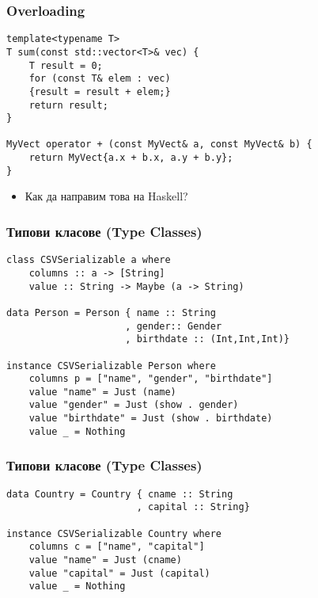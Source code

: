 \documentclass{beamer}
\begin{document}
\begin{frame}[fragile]
\frametitle{Overloading}

\begin{lstlisting}[basicstyle=\small]
template<typename T>
T sum(const std::vector<T>& vec) {
    T result = 0;
    for (const T& elem : vec) 
    {result = result + elem;}
    return result;
}

MyVect operator + (const MyVect& a, const MyVect& b) {
    return MyVect{a.x + b.x, a.y + b.y};
}
\end{lstlisting}

\begin{itemize}
  \item Как да направим това на Haskell?
\end{itemize}

\end{frame}


\begin{frame}[fragile]
\frametitle{Типови класове (Type Classes)}

\begin{lstlisting}[basicstyle=\small]
class CSVSerializable a where
    columns :: a -> [String]
    value :: String -> Maybe (a -> String)

data Person = Person { name :: String
                     , gender:: Gender
                     , birthdate :: (Int,Int,Int)}

instance CSVSerializable Person where
    columns p = ["name", "gender", "birthdate"]
    value "name" = Just (name)
    value "gender" = Just (show . gender)
    value "birthdate" = Just (show . birthdate)
    value _ = Nothing
  \end{lstlisting}


\end{frame}




\begin{frame}[fragile]
\frametitle{Типови класове (Type Classes)}

\begin{lstlisting}[basicstyle=\small]
data Country = Country { cname :: String
                       , capital :: String}

instance CSVSerializable Country where
    columns c = ["name", "capital"]
    value "name" = Just (cname)
    value "capital" = Just (capital)
    value _ = Nothing
\end{lstlisting}


\end{frame}




\end{document}
